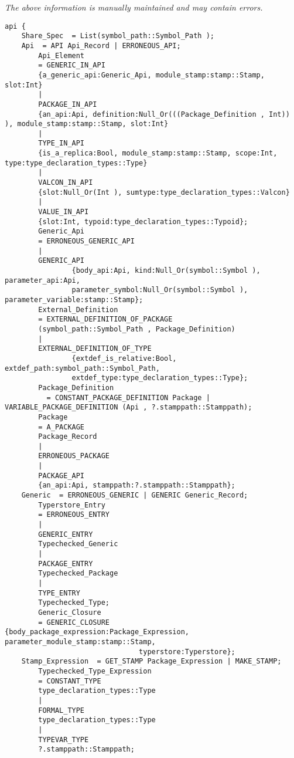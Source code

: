 \label{api:Module\_Level\_Declarations}

{\tiny \it The above information is manually maintained and may contain errors.}
\begin{verbatim}
api {
    Share_Spec  = List(symbol_path::Symbol_Path );
    Api  = API Api_Record | ERRONEOUS_API;
        Api_Element
        = GENERIC_IN_API
        {a_generic_api:Generic_Api, module_stamp:stamp::Stamp, slot:Int}
        |
        PACKAGE_IN_API
        {an_api:Api, definition:Null_Or(((Package_Definition , Int)) ), module_stamp:stamp::Stamp, slot:Int}
        |
        TYPE_IN_API
        {is_a_replica:Bool, module_stamp:stamp::Stamp, scope:Int, type:type_declaration_types::Type}
        |
        VALCON_IN_API
        {slot:Null_Or(Int ), sumtype:type_declaration_types::Valcon}
        |
        VALUE_IN_API
        {slot:Int, typoid:type_declaration_types::Typoid};
        Generic_Api
        = ERRONEOUS_GENERIC_API
        |
        GENERIC_API
                {body_api:Api, kind:Null_Or(symbol::Symbol ), parameter_api:Api,
                parameter_symbol:Null_Or(symbol::Symbol ), parameter_variable:stamp::Stamp};
        External_Definition
        = EXTERNAL_DEFINITION_OF_PACKAGE
        (symbol_path::Symbol_Path , Package_Definition)
        |
        EXTERNAL_DEFINITION_OF_TYPE
                {extdef_is_relative:Bool, extdef_path:symbol_path::Symbol_Path,
                extdef_type:type_declaration_types::Type};
        Package_Definition
          = CONSTANT_PACKAGE_DEFINITION Package | VARIABLE_PACKAGE_DEFINITION (Api , ?.stamppath::Stamppath);
        Package
        = A_PACKAGE
        Package_Record
        |
        ERRONEOUS_PACKAGE
        |
        PACKAGE_API
        {an_api:Api, stamppath:?.stamppath::Stamppath};
    Generic  = ERRONEOUS_GENERIC | GENERIC Generic_Record;
        Typerstore_Entry
        = ERRONEOUS_ENTRY
        |
        GENERIC_ENTRY
        Typechecked_Generic
        |
        PACKAGE_ENTRY
        Typechecked_Package
        |
        TYPE_ENTRY
        Typechecked_Type;
        Generic_Closure
        = GENERIC_CLOSURE       {body_package_expression:Package_Expression, parameter_module_stamp:stamp::Stamp,
                                typerstore:Typerstore};
    Stamp_Expression  = GET_STAMP Package_Expression | MAKE_STAMP;
        Typechecked_Type_Expression
        = CONSTANT_TYPE
        type_declaration_types::Type
        |
        FORMAL_TYPE
        type_declaration_types::Type
        |
        TYPEVAR_TYPE
        ?.stamppath::Stamppath;

\end{verbatim}
